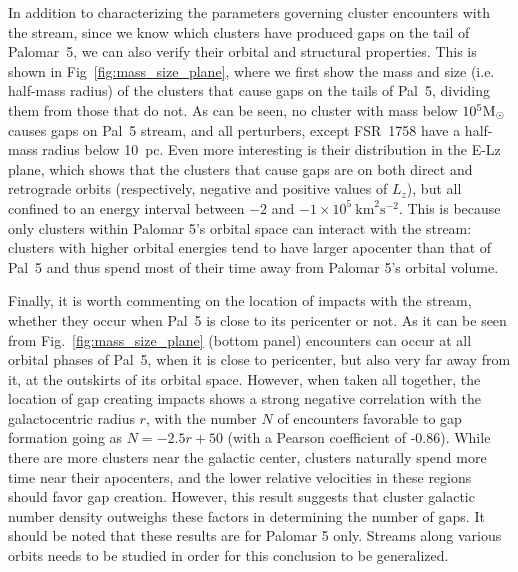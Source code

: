 \documentclass{aa}
\begin{document}
    In addition to characterizing the parameters governing cluster encounters with the stream, since we know which clusters have produced gaps on the tail of Palomar~5, we can also verify their orbital and structural properties. This is shown in Fig~\ref{fig:mass_size_plane}, where we first show the mass and size (i.e. half-mass radius) of the clusters that cause gaps on the tails of Pal~5, dividing them from those that do not. As can be seen, no cluster with mass below $10^5 \rm{M}_\odot$ causes gaps on Pal~5 stream, and all perturbers, except FSR~1758 have a half-mass radius below 10~pc. Even more interesting is their distribution in the E-Lz plane, which shows that the clusters that cause gaps are on both direct and retrograde orbits (respectively, negative and positive values of $L_z$), but all confined to an energy interval between $-2$ and $-1 \times10^5~\textrm{km}^2\textrm{s}^{-2}$. This is because only clusters within Palomar 5's orbital space can interact with the stream: clusters with higher orbital energies tend to have larger apocenter than that of Pal~5 and thus spend most of their time away from Palomar 5's orbital volume. 
    
    Finally, it is worth commenting on the location of impacts with the stream, whether they occur when Pal~5 is close to its pericenter or not. As it can be seen from Fig.~\ref{fig:mass_size_plane} (bottom panel) encounters can occur at all orbital phases of Pal~5, when it is close to pericenter, but also very far away from it, at the outskirts of its orbital space. However, when taken all together, the location of gap creating impacts shows a strong negative correlation with the galactocentric radius $r$, with the number $N$ of encounters favorable to gap formation  going as $N = -2.5r + 50$ (with a Pearson coefficient of -0.86). While there are more clusters near the galactic center, clusters naturally spend more time near their apocenters, and the lower relative velocities in these regions should favor gap creation. However, this result suggests that cluster galactic number density outweighs these factors in determining the number of gaps. It should be noted that these results are for Palomar 5 only. Streams along various orbits needs to be studied in order for this conclusion to be generalized. 

\end{document}
